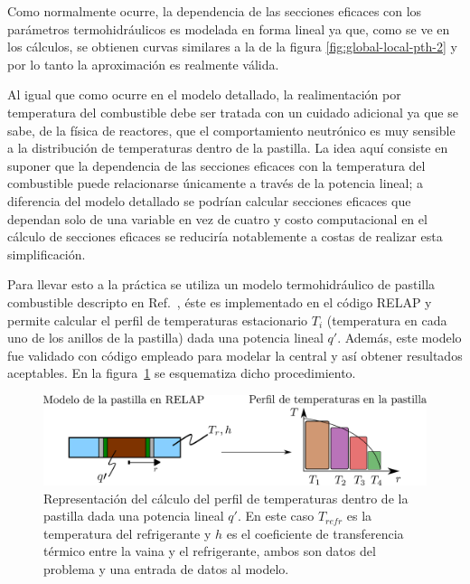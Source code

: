 \documentclass[11pt]{article}
\begin{document}
Como normalmente ocurre, la dependencia de las secciones eficaces con los parámetros termohidráulicos es modelada en forma lineal ya que, como se ve en los cálculos, se obtienen curvas similares a la de la figura \ref{fig:global-local-pth-2} y por lo tanto la aproximación es realmente válida.

Al igual que como ocurre en el modelo detallado, la realimentación por temperatura del combustible debe ser tratada con un cuidado adicional ya que se sabe, de la física de reactores, que el comportamiento neutrónico es muy sensible a la distribución de temperaturas dentro de la pastilla.  La idea aquí consiste en suponer que la dependencia de las secciones eficaces con la temperatura del combustible puede relacionarse únicamente a través de la potencia lineal; a diferencia del modelo detallado se podrían calcular secciones eficaces que dependan solo de una variable en vez de cuatro y costo computacional en el cálculo de secciones eficaces se reduciría notablemente a costas de realizar esta simplificación.

Para llevar esto a la práctica se utiliza un modelo termohidráulico de pastilla combustible descripto en Ref.~\cite{modelos-pastilla-relap}, éste es implementado en el código RELAP y permite calcular el perfil de temperaturas estacionario $T_i$ (temperatura en cada uno de los anillos de la pastilla) dada una potencia lineal $q\prime$. Además, este modelo fue validado con código empleado para modelar la central y así obtener resultados aceptables. En la figura~\ref{fig:modelos-pastilla-relap} se esquematiza dicho procedimiento. 

\begin{figure}[!h]
 \begin{center}
  \includegraphics[width=0.78\linewidth]{imagenes/modelo-pastilla.pdf}
 \end{center}
\caption{\label{fig:modelos-pastilla-relap} Representación del cálculo del perfil de temperaturas dentro de la pastilla dada una potencia lineal $q\prime$. En este caso $T_{refr}$ es la temperatura del refrigerante y $h$ es el coeficiente de transferencia térmico entre la vaina y el refrigerante, ambos son datos del problema y una entrada de datos al modelo.}
\end{figure}
\end{document}
